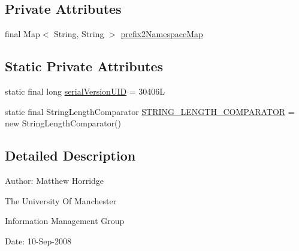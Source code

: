 \subsection*{Private Attributes}
\begin{DoxyCompactItemize}
\item 
final Map$<$ String, String $>$ \hyperlink{classorg_1_1semanticweb_1_1owlapi_1_1util_1_1_default_prefix_manager_a0efc1e306f3827566d55ddd0a77a7569}{prefix2\-Namespace\-Map}
\end{DoxyCompactItemize}
\subsection*{Static Private Attributes}
\begin{DoxyCompactItemize}
\item 
static final long \hyperlink{classorg_1_1semanticweb_1_1owlapi_1_1util_1_1_default_prefix_manager_a8d76188042f49669feb17ef63eebe54f}{serial\-Version\-U\-I\-D} = 30406\-L
\item 
static final String\-Length\-Comparator \hyperlink{classorg_1_1semanticweb_1_1owlapi_1_1util_1_1_default_prefix_manager_a15a00c02016f7d900d76fd6c67586c79}{S\-T\-R\-I\-N\-G\-\_\-\-L\-E\-N\-G\-T\-H\-\_\-\-C\-O\-M\-P\-A\-R\-A\-T\-O\-R} = new String\-Length\-Comparator()
\end{DoxyCompactItemize}


\subsection{Detailed Description}
Author\-: Matthew Horridge\par
 The University Of Manchester\par
 Information Management Group\par
 Date\-: 10-\/\-Sep-\/2008\par
 \par
 

